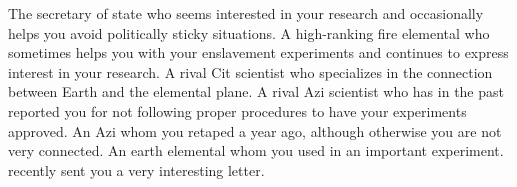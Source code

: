 \documentclass[char]{elementals}
\begin{document}
\begin{contacts}
  \contact{\cDema{}} The secretary of state who seems interested in your research and occasionally helps you avoid politically sticky situations.
 \contact{\cPyro{}} A high-ranking fire elemental who sometimes helps you with your enslavement experiments and continues to express interest in your research.
	\contact{\cGD{}} A rival Cit scientist who specializes in the connection between Earth and the elemental plane.
	\contact{\cScientist{}} A rival Azi scientist who has in the past reported you for not following proper procedures to have your experiments approved.
	\contact{\cDiplomat{}} An Azi whom you retaped a year ago, although otherwise you are not very connected.
	\contact{\cMinion{}} An earth elemental whom you used in an important experiment. \cMinion{\They} recently sent you a very interesting letter.
\end{contacts}
\end{document}
